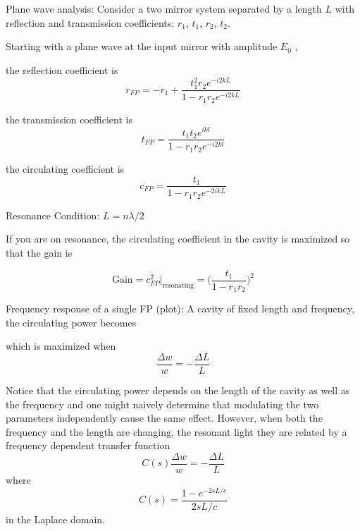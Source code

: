 		Plane wave analysis:
		Consider a two mirror system separated by a length $L$ with reflection and transmission coefficients: $r_1$, $t_1$, $r_2$, $t_2$.
		
		Starting with a plane wave at the input mirror with amplitude $E_0$ \cite{Saulson}, 
		
		the reflection coefficient is 
		\begin{equation}\label{r_FP}
		r_{FP} = -r_1 + \frac{t_1^2 r_2  e^{-i2kL}}{1-r_1 r_2 e^{-i2kL}}
		\end{equation}
		
		the transmission coefficient is
		\begin{equation}\label{t_FP}
		t_{FP} = \frac{t_1 t_2 e^{ikl}}{1-r_1 r_2 e^{-i2kl}}
		\end{equation}
		
		the circulating coefficient is
		\begin{equation}\label{c_FP}
		c_{FP} = \frac{t_1}{1- r_1 r_2 e^{-2ikL}}
		\end{equation}
		
		Resonance Condition: $L = n \lambda / 2$  
		
		If you are on resonance, the circulating coefficient in the cavity is maximized so that the gain is
		
		\begin{equation}
		\text{Gain} = c^2_{FP} \vert_{\text{resonating}} = \bigg( \frac{t_1}{1-r_1 r_2}\bigg)^2
		\end{equation}
		
		Frequency response of a single FP (plot):
		\cite{Lawrence:99}
		A cavity of fixed length and frequency, the circulating power becomes
	
		which is maximized when 
		\begin{equation}
		\frac{\Delta w}{w} = -\frac{\Delta L}{L}
		\end{equation}
		
		Notice that the circulating power depends on the length of the cavity as well as the frequency and one might naively determine that modulating the two parameters independently cause the same effect.  However, when both the frequency and the length are changing, the resonant light  they are related by a frequency dependent transfer function
		\begin{equation}
		C(s) \frac{\Delta w}{w} = -\frac{\Delta L}{L}
		\end{equation}
		where
		\begin{equation}
		C(s) = \frac{1-e^{-2sL/c}}{2sL/c}
		\end{equation}
		in the Laplace domain.
		

